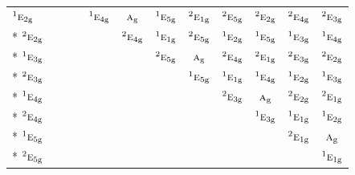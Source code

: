 \documentclass[10pt,a4paper]{article}
\numberwithin{equation}{section}
\newcommand{\irr}[1]{\text{\normalfont\scshape #1}}
\newcommand{\conjpair}[1]{{}^{#1}}
\newcommand{\ptag}[1]{\mathrm{#1}}
\begin{document}
{\begin{longtable}{@{}lccccccccccc@{}}
$\conjpair{1}\irr{e}_{2\ptag{g}}$ &  &  &  & $\conjpair{1}\irr{e}_{4\ptag{g}}$ & $\irr{a}_{\ptag{g}}$ & $\conjpair{1}\irr{e}_{5\ptag{g}}$ & $\conjpair{2}\irr{e}_{1\ptag{g}}$ & $\conjpair{2}\irr{e}_{5\ptag{g}}$ & $\conjpair{2}\irr{e}_{2\ptag{g}}$ & $\conjpair{2}\irr{e}_{4\ptag{g}}$ & $\conjpair{2}\irr{e}_{3\ptag{g}}$\\*
$\conjpair{2}\irr{e}_{2\ptag{g}}$ &  &  &  &  & $\conjpair{2}\irr{e}_{4\ptag{g}}$ & $\conjpair{1}\irr{e}_{1\ptag{g}}$ & $\conjpair{2}\irr{e}_{5\ptag{g}}$ & $\conjpair{1}\irr{e}_{2\ptag{g}}$ & $\conjpair{1}\irr{e}_{5\ptag{g}}$ & $\conjpair{1}\irr{e}_{3\ptag{g}}$ & $\conjpair{1}\irr{e}_{4\ptag{g}}$\\*
$\conjpair{1}\irr{e}_{3\ptag{g}}$ &  &  &  &  &  & $\conjpair{2}\irr{e}_{5\ptag{g}}$ & $\irr{a}_{\ptag{g}}$ & $\conjpair{2}\irr{e}_{4\ptag{g}}$ & $\conjpair{2}\irr{e}_{1\ptag{g}}$ & $\conjpair{2}\irr{e}_{3\ptag{g}}$ & $\conjpair{2}\irr{e}_{2\ptag{g}}$\\*
$\conjpair{2}\irr{e}_{3\ptag{g}}$ &  &  &  &  &  &  & $\conjpair{1}\irr{e}_{5\ptag{g}}$ & $\conjpair{1}\irr{e}_{1\ptag{g}}$ & $\conjpair{1}\irr{e}_{4\ptag{g}}$ & $\conjpair{1}\irr{e}_{2\ptag{g}}$ & $\conjpair{1}\irr{e}_{3\ptag{g}}$\\*
$\conjpair{1}\irr{e}_{4\ptag{g}}$ &  &  &  &  &  &  &  & $\conjpair{2}\irr{e}_{3\ptag{g}}$ & $\irr{a}_{\ptag{g}}$ & $\conjpair{2}\irr{e}_{2\ptag{g}}$ & $\conjpair{2}\irr{e}_{1\ptag{g}}$\\*
$\conjpair{2}\irr{e}_{4\ptag{g}}$ &  &  &  &  &  &  &  &  & $\conjpair{1}\irr{e}_{3\ptag{g}}$ & $\conjpair{1}\irr{e}_{1\ptag{g}}$ & $\conjpair{1}\irr{e}_{2\ptag{g}}$\\*
$\conjpair{1}\irr{e}_{5\ptag{g}}$ &  &  &  &  &  &  &  &  &  & $\conjpair{2}\irr{e}_{1\ptag{g}}$ & $\irr{a}_{\ptag{g}}$\\*
$\conjpair{2}\irr{e}_{5\ptag{g}}$ &  &  &  &  &  &  &  &  &  &  & $\conjpair{1}\irr{e}_{1\ptag{g}}$\\
\bottomrule\end{longtable}}
\end{document}

